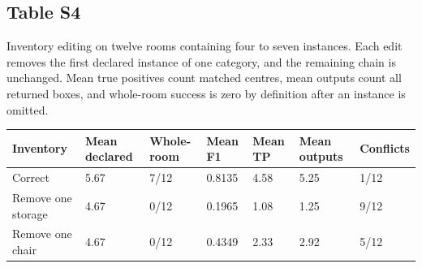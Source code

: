 \documentclass[10pt,letterpaper]{article}
\begin{document}
\begin{minipage}{\linewidth}\subsection*{Table S4}
Inventory editing on twelve rooms containing four to seven instances.
Each edit removes the first declared instance of one category, and the
remaining chain is unchanged. Mean true positives count matched centres,
mean outputs count all returned boxes, and whole-room success is zero by
definition after an instance is omitted.



\begin{center}\small\begin{tabular}{@{}p{}p{}p{}p{}p{}p{}p{}@{}}\toprule
\textbf{Inventory} & \textbf{Mean declared} & \textbf{Whole-room} & \textbf{Mean F1} & \textbf{Mean TP} & \textbf{Mean outputs} & \textbf{Conflicts} \\ \midrule
Correct & 5.67 & 7/12 & 0.8135 & 4.58 & 5.25 & 1/12 \\
Remove one storage & 4.67 & 0/12 & 0.1965 & 1.08 & 1.25 & 9/12 \\
Remove one chair & 4.67 & 0/12 & 0.4349 & 2.33 & 2.92 & 5/12 \\
\bottomrule\end{tabular}\end{center}
\end{minipage}\par\medskip
\end{document}
